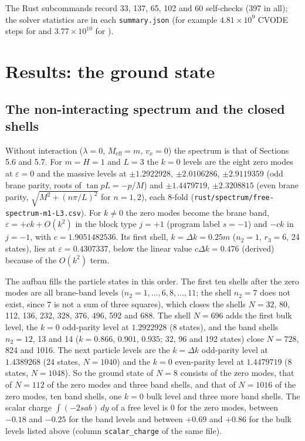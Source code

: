 \documentclass[11pt]{article}
\begin{document}
The Rust subcommands record 33, 137, 65, 102 and 60 self-checks (397 in all); the solver statistics are in each \texttt{summary.\allowbreak{}json} (for example $4.81\times10^9$ CVODE steps for \texttt{} and $3.77\times10^{10}$ for \texttt{}).

\section{Results: the ground state}

\subsection{The non-interacting spectrum and the closed shells}

Without interaction ($\lambda=0$, $M_{\mathrm{eff}}=m$, $v_x=0$) the spectrum is that of Sections 5.6 and 5.7. For $m=H=1$ and $L=3$ the $k=0$ levels are the eight zero modes at $\varepsilon=0$ and the massive levels at $\pm1.2922928$, $\pm2.0106286$, $\pm2.9119359$ (odd brane parity, roots of $\tan pL=-p/M$) and $\pm1.4479719$, $\pm2.3208815$ (even brane parity, $\sqrt{M^2+(n\pi/L)^2}$ for $n=1,2$), each 8-fold (\texttt{rust/spe\allowbreak{}ctrum/fr\allowbreak{}ee-spect\allowbreak{}rum-m1-L\allowbreak{}3.csv}). For $k\neq0$ the zero modes become the brane band, $\varepsilon=+ck+O(k^2)$ in the block type $j=+1$ (program label $s=-1$) and $-ck$ in $j=-1$, with $c=1.9051482536$. Its first shell, $k=\Delta k=0.25m$ ($n_2=1$, $r_3=6$, 24 states), lies at $\varepsilon=0.4307337$, below the linear value $c\Delta k=0.476$ (derived) because of the $O(k^2)$ term.

The aufbau fills the particle states in this order. The first ten shells after the zero modes are all brane-band levels ($n_2=1,\dots,6,8,\dots,11$; the shell $n_2=7$ does not exist, since $7$ is not a sum of three squares), which closes the shells $N=32$, 80, 112, 136, 232, 328, 376, 496, 592 and 688. The shell $N=696$ adds the first bulk level, the $k=0$ odd-parity level at $1.2922928$ (8 states), and the band shells $n_2=12$, 13 and 14 ($k=0.866$, $0.901$, $0.935$; 32, 96 and 192 states) close $N=728$, 824 and 1016. The next particle levels are the $k=\Delta k$ odd-parity level at $1.4389268$ (24 states, $N=1040$) and the $k=0$ even-parity level at $1.4479719$ (8 states, $N=1048$). So the ground state of $N=8$ consists of the zero modes, that of $N=112$ of the zero modes and three band shells, and that of $N=1016$ of the zero modes, ten band shells, one $k=0$ bulk level and three more band shells. The scalar charge $\int(-2sab)\,dy$ of a free level is $0$ for the zero modes, between $-0.18$ and $-0.25$ for the band levels and between $+0.69$ and $+0.86$ for the bulk levels listed above (column \texttt{scalar\_c\allowbreak{}harge} of the same file).
\end{document}
